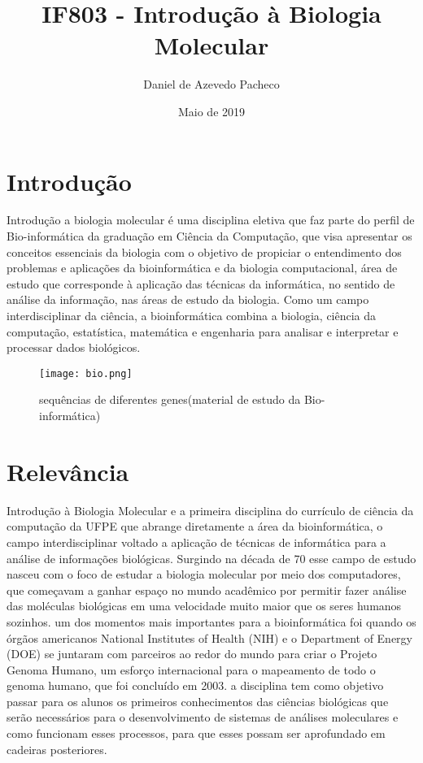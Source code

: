\documentclass{article}
\title{IF803 - Introdução à Biologia Molecular}
\author{Daniel de Azevedo Pacheco }
\date{Maio de 2019}
\begin{document}
\maketitle

\section{Introdução}
Introdução a biologia molecular é uma disciplina eletiva que faz parte do perfil de Bio-informática da graduação em Ciência da Computação, que visa apresentar os conceitos essenciais da biologia com o objetivo de propiciar o entendimento dos problemas e aplicações da bioinformática e da biologia computacional\cite{site}, área de estudo que corresponde à aplicação das técnicas da informática, no sentido de análise da informação, nas áreas de estudo da biologia. Como um campo interdisciplinar da ciência, a bioinformática combina a biologia, ciência da computação, estatística, matemática e engenharia para analisar e interpretar e processar dados biológicos. 

\begin{figure}[h]
    \centering
    \texttt{[image: bio.png]}
    \caption{sequências de diferentes genes(material de estudo da Bio-informática) \cite{img}}
    \label{fig:my_label}
\end{figure}

\section{Relevância}
Introdução à Biologia Molecular e a primeira disciplina do currículo de ciência da computação da UFPE que abrange diretamente a área da bioinformática, o campo interdisciplinar voltado a aplicação de técnicas de informática para a análise de informações biológicas. Surgindo na década de 70 esse campo de estudo nasceu com o foco de estudar a biologia molecular por meio dos computadores, que começavam a ganhar espaço no mundo acadêmico por permitir fazer análise das moléculas biológicas em uma velocidade muito maior que os seres humanos sozinhos\cite{slide1}.
um dos momentos mais importantes para a bioinformática foi quando os órgãos americanos National Institutes of Health (NIH) e o Department of Energy (DOE) se juntaram com parceiros ao redor do mundo para criar o Projeto Genoma Humano, um esforço internacional para o mapeamento de todo o genoma humano, que foi concluído em 2003.\cite{slide2}
a disciplina tem como objetivo passar para os alunos os primeiros conhecimentos das ciências biológicas que serão necessários para o desenvolvimento de sistemas de análises moleculares e como funcionam esses processos, para que esses possam ser aprofundado em cadeiras posteriores. 
\end{document}
